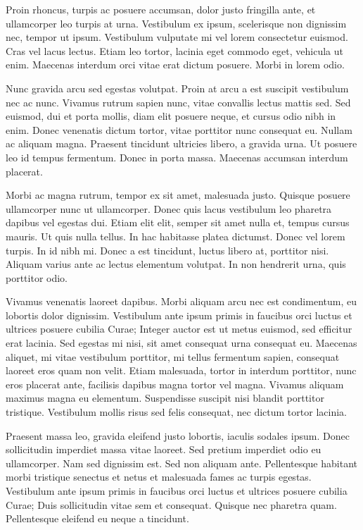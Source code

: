 \documentclass{article}
\begin{document}
  Proin rhoncus, turpis ac posuere accumsan, dolor justo fringilla ante, et ullamcorper leo turpis at urna. Vestibulum ex ipsum, scelerisque non dignissim nec, tempor ut ipsum. Vestibulum vulputate mi vel lorem consectetur euismod. Cras vel lacus lectus. Etiam leo tortor, lacinia eget commodo eget, vehicula ut enim. Maecenas interdum orci vitae erat dictum posuere. Morbi in lorem odio.\stopmsdata


  Nunc gravida arcu sed egestas volutpat. Proin at arcu a est suscipit vestibulum nec ac nunc. Vivamus rutrum sapien nunc, vitae convallis lectus mattis sed. Sed euismod, dui et porta mollis, diam elit posuere neque, et cursus odio nibh in enim. Donec venenatis dictum tortor, vitae porttitor nunc consequat eu. Nullam ac aliquam magna. Praesent tincidunt ultricies libero, a gravida urna. Ut posuere leo id tempus fermentum. Donec in porta massa. Maecenas accumsan interdum placerat.\stopmsdata


  Morbi ac magna rutrum, tempor ex sit amet, malesuada justo. Quisque posuere ullamcorper nunc ut ullamcorper. Donec quis lacus vestibulum leo pharetra dapibus vel egestas dui. Etiam elit elit, semper sit amet nulla et, tempus cursus mauris. Ut quis nulla tellus. In hac habitasse platea dictumst. Donec vel lorem turpis. In id nibh mi. Donec a est tincidunt, luctus libero at, porttitor nisi. Aliquam varius ante ac lectus elementum volutpat. In non hendrerit urna, quis porttitor odio.\stopmsdata


  Vivamus venenatis laoreet dapibus. Morbi aliquam arcu nec est condimentum, eu lobortis dolor dignissim. Vestibulum ante ipsum primis in faucibus orci luctus et ultrices posuere cubilia Curae; Integer auctor est ut metus euismod, sed efficitur erat lacinia. Sed egestas mi nisi, sit amet consequat urna consequat eu. Maecenas aliquet, mi vitae vestibulum porttitor, mi tellus fermentum sapien, consequat laoreet eros quam non velit. Etiam malesuada, tortor in interdum porttitor, nunc eros placerat ante, facilisis dapibus magna tortor vel magna. Vivamus aliquam maximus magna eu elementum. Suspendisse suscipit nisi blandit porttitor tristique. Vestibulum mollis risus sed felis consequat, nec dictum tortor lacinia.\stopmsdata


  Praesent massa leo, gravida eleifend justo lobortis, iaculis sodales ipsum. Donec sollicitudin imperdiet massa vitae laoreet. Sed pretium imperdiet odio eu ullamcorper. Nam sed dignissim est. Sed non aliquam ante. Pellentesque habitant morbi tristique senectus et netus et malesuada fames ac turpis egestas. Vestibulum ante ipsum primis in faucibus orci luctus et ultrices posuere cubilia Curae; Duis sollicitudin vitae sem et consequat. Quisque nec pharetra quam. Pellentesque eleifend eu neque a tincidunt.\stopmsdata
\end{document}
